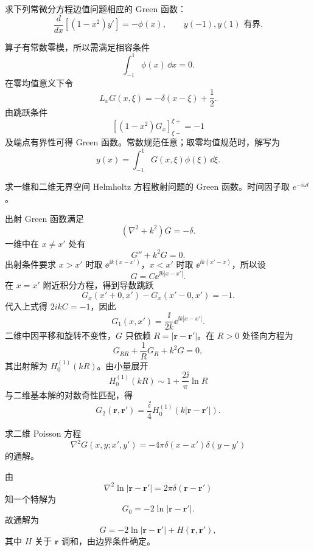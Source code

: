 ﻿


\begin{question}
求下列常微分方程边值问题相应的 Green 函数：
\[
\frac d{dx}\left[(1-x^2)y'\right]=-\phi(x),\qquad
 y(-1),y(1)\text{ 有界}.
\]
\begin{solution}
算子有常数零模，所以需满足相容条件
\[
\int_{-1}^1\phi(x)\,\dd{x}=0.
\]
在零均值意义下令
\[
L_xG(x,\xi)=-\delta(x-\xi)+\frac12.
\]
由跳跃条件
\[
\left[(1-x^2)G_x\right]_{\xi-}^{\xi+}=-1
\]
及端点有界性可得 Green 函数。常数规范任意；取零均值规范时，解写为
\[
y(x)=\int_{-1}^1G(x,\xi)\phi(\xi)\,\dd{\xi} .
\]
\end{solution}
\end{question}

\begin{question}
求一维和二维无界空间 Helmholtz 方程散射问题的 Green 函数。时间因子取 \(e^{-i\omega t}\)。
\begin{solution}
出射 Green 函数满足
\[
(\nabla^2+k^2)G=-\delta.
\]
一维中在 \(x\ne x'\) 处有
\[
G''+k^2G=0.
\]
出射条件要求 \(x>x'\) 时取 \(\ee^{\ii k(x-x')}\)，\(x<x'\) 时取 \(\ee^{\ii k(x'-x)}\)，所以设
\[
G=C \ee^{\ii k|x-x'|}.
\]
在 \(x=x'\) 附近积分方程，得到导数跳跃
\[
G_x(x'+0,x')-G_x(x'-0,x')=-1.
\]
代入上式得 \(2ikC=-1\)，因此
\[
G_1(x,x')=\frac{\ii}{2k}\ee^{\ii k|x-x'|}.
\]
二维中因平移和旋转不变性，\(G\) 只依赖 \(R=|\bm r-\bm r'|\)。在 \(R>0\) 处径向方程为
\[
G_{RR}+\frac1R G_R+k^2G=0,
\]
其出射解为 \(H_0^{(1)}(kR)\)。由小量展开
\[
H_0^{(1)}(kR)\sim 1+\frac{2\ii}{\pi}\ln R
\]
与二维基本解的对数奇性匹配，得
\[
G_2(\bm r,\bm r')=\frac{\ii}{4}H_0^{(1)}(k|\bm r-\bm r'|).
\]
\end{solution}
\end{question}

\begin{question}
求二维 Poisson 方程
\[
\nabla^2G(x,y;x',y')=-4\pi\delta(x-x')\delta(y-y')
\]
的通解。
\begin{solution}
由
\[
\nabla^2\ln |\bm r-\bm r'|=2\pi\delta(\bm r-\bm r')
\]
知一个特解为
\[
G_0=-2\ln |\bm r-\bm r'|.
\]
故通解为
\[
G=-2\ln |\bm r-\bm r'|+H(\bm r,\bm r'),
\]
其中 \(H\) 关于 \(\bm r\) 调和，由边界条件确定。
\end{solution}
\end{question}

